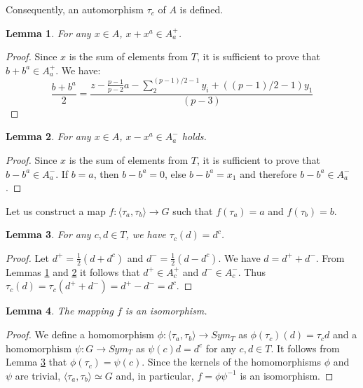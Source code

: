 \documentclass[12pt]{article}
\newcommand\la{\langle}
\newcommand\ra{\rangle}
\newtheorem{lem}{Lemma}
\begin{document}
Consequently, an automorphism $\tau_c $ of $A$ is defined.

\begin{lem}\label{xxa}
For any $x\in A$, $x+x^a\in A^+_a$.
\end{lem}
\begin{proof}
Since $x$ is the sum of elements from $T$, it is sufficient to prove that $b+b^a\in A^+_a$. We have:	$$\frac{b+b^a}{2}=\frac{z-\frac{p-1}{p-2}a-\sum_{2}^{(p-1)/2-1} y_i +((p-1)/2-1)y_1}{(p-3)}$$  
\end{proof}
\begin{lem}\label{xmxa}
	For any $x\in A$, $x-x^a\in A^-_a$ holds.
\end{lem}
\begin{proof}
	Since $x$ is the sum of elements from $T$, it is sufficient to prove that $b-b^a\in A^-_a$. If $b=a$, then $b-b^a=0$, else $b-b^a=x_1$ and therefore $b-b^a\in A_a^-$.     
\end{proof}

Let us construct a map $f: \langle \tau_a, \tau_b \rangle \to G$ such that $f(\tau_a)=a$ and $f(\tau_b)=b$.

\begin{lem}\label{Mi2}
	For any $c,d\in T$, we have $\tau_c(d)=d^c$.
\end{lem}
\begin{proof}
	Let $d^+=\frac{1}{2}(d+d^c)$ and $d^-=\frac{1}{2}(d-d^c)$. We have $d=d^++d^-$. From Lemmas \ref{xxa} and \ref{xmxa} it follows that $d^+\in A^+_c$ and $d^-\in A^-_c$. Thus $\tau_c(d)=\tau_c(d^++d^-)=d^+-d^-=d^c$. 
\end{proof}

\begin{lem}
	The mapping $f$ is an isomorphism.
\end{lem}
\begin{proof}
We define a homomorphism $\phi:\la\tau_a,\tau_b\ra\rightarrow Sym_{T}$ as $\phi(\tau_c)(d)=\tau_cd$ and a homomorphism $\psi:G\rightarrow Sym_{T}$ as $\psi(c)d=d^c$ for any $c,d\in T$. It follows from Lemma \ref{Mi2} that $\phi(\tau_c)=\psi(c)$. Since the kernels of the homomorphisms $\phi$ and $\psi$ are trivial, $\la\tau_a,\tau_b\ra\simeq G$ and, in particular, $f=\phi\psi^{-1}$ is an isomorphism.
\end{proof}	
\end{document}
